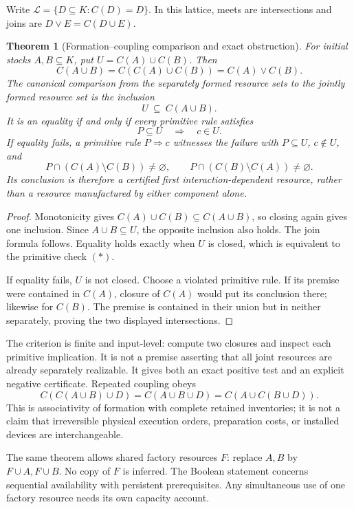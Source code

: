 \documentclass[11pt]{article}
\newtheorem{theorem}{Theorem}[section]
\theoremstyle{definition}
\theoremstyle{remark}
\begin{document}
Write $\mathcal L=\{D\subseteq K:C(D)=D\}$. In this lattice, meets are
intersections and joins are $D\vee E=C(D\cup E)$.

\begin{theorem}[Formation--coupling comparison and exact obstruction]
\label{syn-thm:coupling}
For initial stocks $A,B\subseteq K$, put $U=C(A)\cup C(B)$.
Then
\[
 C(A\cup B)=C(C(A)\cup C(B))=C(A)\vee C(B).
\]
The canonical comparison from the separately formed resource sets to the
jointly formed resource set is the inclusion
\[
 U\ \subseteq\ C(A\cup B).
\]
It is an equality if and only if every primitive rule satisfies
\[
             P\subseteq U\quad\Longrightarrow\quad c\in U.
\tag{*}
\]
If equality fails, a primitive rule $P\Rightarrow c$ witnesses the failure
with $P\subseteq U$, $c\notin U$, and
\[
 P\cap(C(A)\setminus C(B))\ne\varnothing,
 \qquad
 P\cap(C(B)\setminus C(A))\ne\varnothing.
\]
Its conclusion is therefore a certified first interaction-dependent
resource, rather than a resource manufactured by either component alone.
\end{theorem}
\begin{proof}
Monotonicity gives $C(A)\cup C(B)\subseteq C(A\cup B)$, so closing again
gives one inclusion. Since $A\cup B\subseteq U$, the opposite inclusion
also holds. The join formula follows. Equality holds exactly when $U$ is
closed, which is equivalent to the primitive check $(*)$.

If equality fails, $U$ is not closed. Choose a violated primitive rule.
If its premise were contained in $C(A)$, closure of $C(A)$ would put its
conclusion there; likewise for $C(B)$. The premise is contained in their
union but in neither separately, proving the two displayed intersections.
\end{proof}

The criterion is finite and input-level: compute two closures and inspect
each primitive implication. It is not a premise asserting that all joint
resources are already separately realizable. It gives both an exact
positive test and an explicit negative certificate. Repeated coupling
obeys
\[
 C(C(A\cup B)\cup D)=C(A\cup B\cup D)
                    =C(A\cup C(B\cup D)).
\]
This is associativity of formation with complete retained inventories;
it is not a claim that irreversible physical execution orders, preparation
costs, or installed devices are interchangeable.

The same theorem allows shared factory resources $F$: replace $A,B$ by
$F\cup A,F\cup B$. No copy of $F$ is inferred. The Boolean statement
concerns sequential availability with persistent prerequisites. Any
simultaneous use of one factory resource needs its own capacity account.
\end{document}
